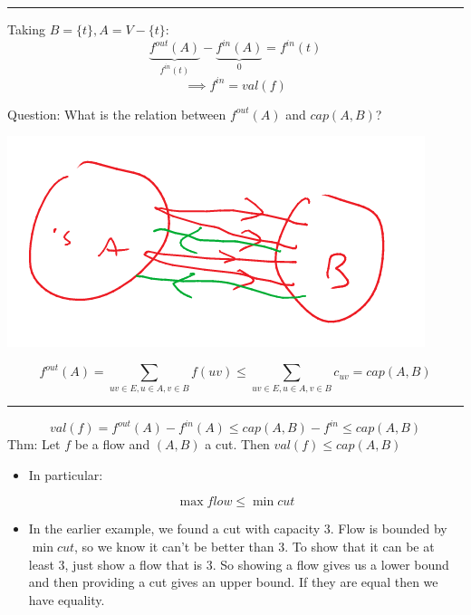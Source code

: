 \documentclass[11pt]{article}
\begin{document}
\noindent\rule{\textwidth}{0.5pt}
Taking \(B=\{t\}, A = V - \{t\}\):
$$\underbrace{f^{out}(A)}_{f^{in}(t)}-\underbrace{f^{in}(A)}_{0} = f^{in}(t)$$
$$\implies f^{in} = val(f)$$

Question: What is the relation between \(f^{out}(A)\) and \(cap(A,B)\)?
\begin{center}
\includegraphics[width=.9\linewidth]{./Images/I119.png}
\end{center}
$$f^{out}(A)=\sum_{uv\in E,u \in A, v \in B} f(uv) \leq \sum_{uv \in E, u \in A, v \in B}c_{uv} = cap(A,B)$$

\noindent\rule{\textwidth}{0.5pt}
$$val(f) = f^{out}(A) - f^{in}(A) \leq cap(A,B) - f^{in} \leq cap(A,B)$$
Thm: Let \(f\) be a flow and \((A,B)\) a cut. Then \(val(f) \leq cap(A,B)\)
\begin{itemize}
\item In particular:
\end{itemize}
$$\max flow \leq \min cut$$
\begin{itemize}
\item In the earlier example, we found a cut with capacity \(3\). Flow is bounded by \(\min cut\), so we know it can't be better than \(3\). To show that it can be at least \(3\), just show a flow that is \(3\). So showing a flow gives us a lower bound and then providing a cut gives an upper bound. If they are equal then we have equality.
\end{itemize}
\end{document}
